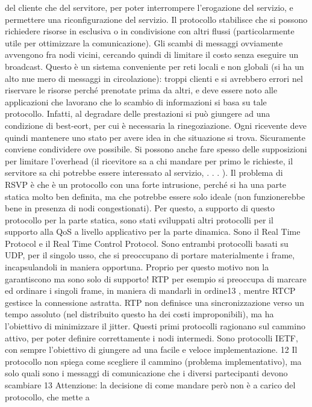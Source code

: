 del cliente che del servitore, per poter interrompere l'erogazione del servizio,
e permettere una riconfigurazione del servizio. Il protocollo stabilisce che si
possono richiedere risorse in esclusiva o in condivisione con altri flussi (particolarmente utile per ottimizzare la
comunicazione). Gli scambi di messaggi
ovviamente avvengono fra nodi vicini, cercando quindi di limitare il costo senza
eseguire un broadcast.
Questo è un sistema conveniente per reti locali e non globali (si ha un alto nue
mero di messaggi in circolazione): troppi clienti e si avrebbero errori nel riservare
le risorse perché prenotate prima da altri, e deve essere noto alle applicazioni
che lavorano che lo scambio di informazioni si basa su tale protocollo. Infatti,
al degradare delle prestazioni si può giungere ad una condizione di best-eort,
per cui è necessaria la rinegoziazione. Ogni ricevente deve quindi mantenere
uno stato per avere idea in che situazione si trova. Sicuramente conviene condividere ove possibile. Si possono anche
fare spesso delle supposizioni per limitare
l'overhead (il ricevitore sa a chi mandare per primo le richieste, il servitore sa
chi potrebbe essere interessato al servizio, . . . ).
Il problema di RSVP è che è un protocollo con una forte intrusione, perché si
ha una parte statica molto ben definita, ma che potrebbe essere solo ideale (non
funzionerebbe bene in presenza di nodi congestionati). Per questo, a supporto
di questo protocollo per la parte statica, sono stati sviluppati altri protocolli
per il supporto alla QoS a livello applicativo per la parte dinamica. Sono il Real
Time Protocol e il Real Time Control Protocol. Sono entrambi protocolli basati
su UDP, per il singolo usso, che si preoccupano di portare materialmente i
frame, incapsulandoli in maniera opportuna. Proprio per questo motivo non
la garantiscono ma sono solo di supporto! RTP per esempio si preoccupa di
marcare ed ordinare i singoli frame, in maniera di mandarli in ordine13 , mentre
RTCP gestisce la connessione astratta.
RTP non definisce una sincronizzazione verso un tempo assoluto (nel distribuito questo ha dei costi improponibili), ma ha
l'obiettivo di minimizzare il
jitter. Questi primi protocolli ragionano sul cammino attivo, per poter definire
correttamente i nodi intermedi. Sono protocolli IETF, con sempre l'obiettivo di
giungere ad una facile e veloce implementazione.
12 Il protocollo non spiega come scegliere il cammino (problema implementativo), ma solo
quali sono i messaggi di comunicazione che i diversi partecipanti devono scambiare
13 Attenzione: la decisione di come mandare però non è a carico del protocollo, che mette a
